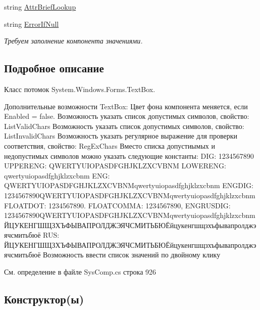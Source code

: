 \begin{DoxyCompactItemize}
string \mbox{\hyperlink{class_f_b_a_1_1_text_box_f_b_a_a5732584edb6adcbc5b678bc56f5c289f}{Attr\+Brief\+Lookup}}
\item 
string \mbox{\hyperlink{class_f_b_a_1_1_text_box_f_b_a_a986261c15f5947ab0ab4d66820bad7aa}{Error\+If\+Null}}
\begin{DoxyCompactList}\small\item\em Требуем заполнение компонента значениями. ~\newline
\end{DoxyCompactList}\end{DoxyCompactItemize}


\subsection{Подробное описание}
Класс потомок System.\+Windows.\+Forms.\+Text\+Box. ~\newline


Дополнительные возможности Text\+Box\+: Цвет фона компонента меняется, если Enabled = false. Возможность указать список допустимых символов, свойство\+: List\+Valid\+Chars Возможность указать список допустимых символов, свойство\+: List\+Invalid\+Chars Возможность указать регулярное выражение для проверки соответствия, свойство\+: Reg\+Ex\+Chars Вместо списка допустиымых и недопустимых символов можно указать следующие константы\+: D\+IG\+: 1234567890 U\+P\+P\+E\+R\+E\+NG\+: Q\+W\+E\+R\+T\+Y\+U\+I\+O\+P\+A\+S\+D\+F\+G\+H\+J\+K\+L\+Z\+X\+C\+V\+B\+NM L\+O\+W\+E\+R\+E\+NG\+: qwertyuiopasdfghjklzxcbnm E\+NG\+: Q\+W\+E\+R\+T\+Y\+U\+I\+O\+P\+A\+S\+D\+F\+G\+H\+J\+K\+L\+Z\+X\+C\+V\+B\+N\+Mqwertyuiopasdfghjklzxcbnm E\+N\+G\+D\+IG\+: 1234567890\+Q\+W\+E\+R\+T\+Y\+U\+I\+O\+P\+A\+S\+D\+F\+G\+H\+J\+K\+L\+Z\+X\+C\+V\+B\+N\+Mqwertyuiopasdfghjklzxcbnm F\+L\+O\+A\+T\+D\+OT\+: 1234567890. F\+L\+O\+A\+T\+C\+O\+M\+MA\+: 1234567890, E\+N\+G\+R\+U\+S\+D\+IG\+: 1234567890\+Q\+W\+E\+R\+T\+Y\+U\+I\+O\+P\+A\+S\+D\+F\+G\+H\+J\+K\+L\+Z\+X\+C\+V\+B\+N\+MqwertyuiopasdfghjklzxcbnmЙЦУКЕНГШЩЗХЪФЫВАПРОЛДЖЭЯЧСМИТЬБЮЁйцукенгшщзхъфывапролджэячсмитьбюё R\+US\+: ЙЦУКЕНГШЩЗХЪФЫВАПРОЛДЖЭЯЧСМИТЬБЮЁйцукенгшщзхъфывапролджэячсмитьбюё Возможность ввести список значений по двойному клику 

См. определение в файле Sys\+Comp.\+cs строка 926



\subsection{Конструктор(ы)}
\mbox{\label{class_f_b_a_1_1_text_box_f_b_a_a8f258f4d92a7187a7d0223855287a8f9}} 
